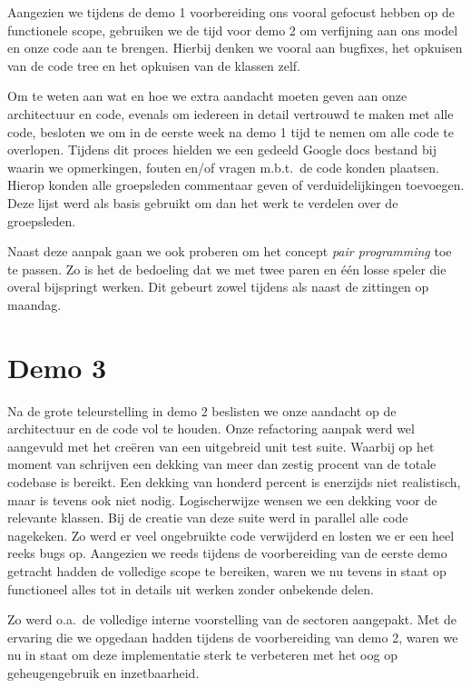 \documentclass[12pt,a4paper]{report}
\begin{document}
Aangezien we tijdens de demo 1 voorbereiding ons vooral gefocust hebben op de functionele scope, gebruiken we de tijd voor demo 2 om verfijning aan ons model en onze code aan te brengen. Hierbij denken we vooral aan bugfixes, het opkuisen van de code tree en het opkuisen van de klassen zelf.

Om te weten aan wat en hoe we extra aandacht moeten geven aan onze architectuur en code, evenals om iedereen in detail vertrouwd te maken met alle code, besloten we om in de eerste week na demo 1 tijd te nemen om alle code te overlopen. Tijdens dit proces hielden we een gedeeld Google docs bestand bij waarin we opmerkingen, fouten en/of vragen m.b.t.\ de code konden plaatsen. Hierop konden alle groepsleden commentaar geven of verduidelijkingen toevoegen. Deze lijst werd als basis gebruikt om dan het werk te verdelen over de groepsleden.

Naast deze aanpak gaan we ook proberen om het concept \emph{pair programming} toe te passen. Zo is het de bedoeling dat we met twee paren en \'e\'en losse speler die overal bijspringt werken. Dit gebeurt zowel tijdens als naast de zittingen op maandag.

\section{Demo 3}

Na de grote teleurstelling in demo 2 beslisten we onze aandacht op de architectuur en de code vol te houden. Onze refactoring aanpak werd wel aangevuld met het cre\"eren van een uitgebreid unit test suite. Waarbij op het moment van schrijven een dekking van meer dan zestig procent van de totale codebase is bereikt. Een dekking van honderd percent is enerzijds niet realistisch, maar is tevens ook niet nodig. Logischerwijze wensen we een dekking voor de relevante klassen. Bij de creatie van deze suite werd in parallel alle code nagekeken. Zo werd er veel ongebruikte code verwijderd en losten we er een heel reeks bugs op. Aangezien we reeds tijdens de voorbereiding van de eerste demo getracht hadden de volledige scope te bereiken, waren we nu tevens in staat op functioneel alles tot in details uit werken zonder onbekende delen.

Zo werd o.a.\ de volledige interne voorstelling van de sectoren aangepakt. Met de ervaring die we opgedaan hadden tijdens de voorbereiding van demo 2, waren we nu in staat om deze implementatie sterk te verbeteren met het oog op geheugengebruik en inzetbaarheid.
\end{document}
